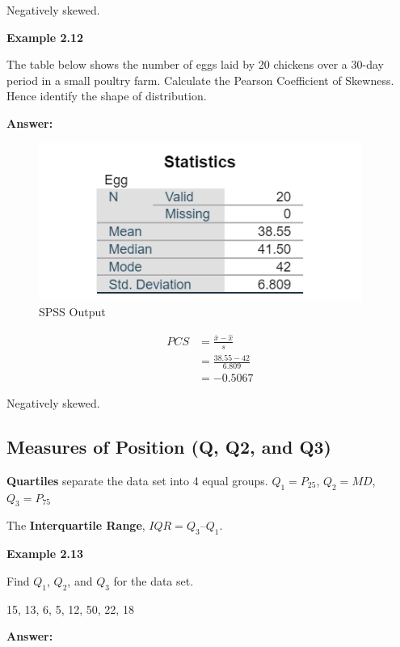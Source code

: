 \documentclass[
  a4paper,
  DIV=11,
  numbers=noendperiod,
  oneside]{scrreprt}
\begin{document}
Negatively skewed.

{\textbf{Example 2.12}}

The table below shows the number of eggs laid by 20 chickens over a
30-day period in a small poultry farm. Calculate the Pearson Coefficient
of Skewness. Hence identify the shape of distribution.

{\textbf{Answer:}}

\begin{figure}

{\centering \includegraphics[width=4.16667in,height=\textheight]{images/ch2/picture16.png}

}

\caption{SPSS Output}

\end{figure}

\[
\begin{aligned}
PCS &= \frac{\bar{x} - \hat{x}}{s} \\
&= \frac{38.55 - 42}{6.809} \\
&= -0.5067
\end{aligned}
\]

Negatively skewed.

\hypertarget{measures-of-position-q-q2-and-q3}{%
\subsection{Measures of Position (Q, Q2, and
Q3)}\label{measures-of-position-q-q2-and-q3}}

\textbf{Quartiles} separate the data set into 4 equal groups.
\(Q_1 = P_{25}\), \(Q_2 = MD\), \(Q_3 = P_{75}\)

The \textbf{Interquartile Range}, \(IQR = Q_3 – Q_1\).

{\textbf{Example 2.13}}

Find \(Q_1\), \(Q_2\), and \(Q_3\) for the data set.

15, 13, 6, 5, 12, 50, 22, 18

{\textbf{Answer:}}
\end{document}
